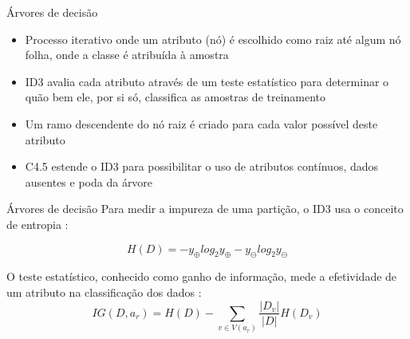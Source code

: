 \begin{frame}{Árvores de decisão}
\begin{itemize}
    \item Processo iterativo onde um atributo (nó) é escolhido como raiz até algum nó folha, onde a classe é atribuída à amostra
    \item ID3 avalia cada atributo através de um teste estatístico para determinar o quão bem ele, por si só, classifica as amostras de treinamento \citep{quinlan:86}
    \item Um ramo descendente do nó raiz é criado para cada valor possível deste atributo \citep{mitchell:97}
    \item C4.5 estende o ID3 para possibilitar o uso de atributos contínuos, dados ausentes e poda da árvore \citet{quinlan:93}
\end{itemize}
\end{frame}

\begin{frame}{Árvores de decisão}
Para medir a impureza de uma partição, o ID3 usa o conceito de entropia \citep{quinlan:86}:

\begin{equation*}
H(D) = - y_\oplus log_2 y_\oplus - y_\ominus log_2 y_\ominus
\end{equation*}

O teste estatístico, conhecido como ganho de informação, mede a efetividade de um atributo na classificação dos dados \citep{quinlan:86}:
\begin{equation*}
IG(D, a_r) = H(D) - \sum_{v \in V(a_r)} \frac{|D_v|}{|D|} H(D_v)
\end{equation*}

\end{frame}